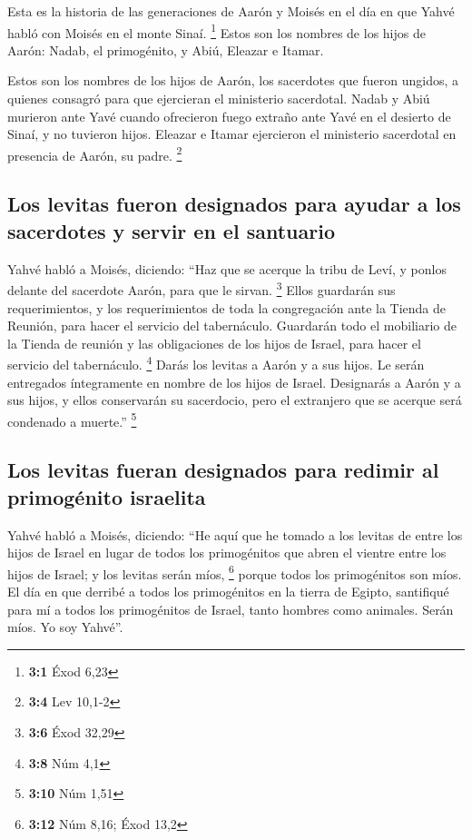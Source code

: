 \begin{paracol}{2}
 Esta es la historia de las generaciones de Aarón y Moisés
en el día en que Yahvé habló con Moisés en el monte Sinaí. \footnote{\textbf{3:1}
  Éxod 6,23}  Estos son los nombres de los hijos de Aarón:
Nadab, el primogénito, y Abiú, Eleazar e Itamar.

 Estos son los nombres de los hijos de Aarón, los
sacerdotes que fueron ungidos, a quienes consagró para que ejercieran el
ministerio sacerdotal.  Nadab y Abiú murieron ante Yavé
cuando ofrecieron fuego extraño ante Yavé en el desierto de Sinaí, y no
tuvieron hijos. Eleazar e Itamar ejercieron el ministerio sacerdotal en
presencia de Aarón, su padre. \footnote{\textbf{3:4} Lev 10,1-2}

\hypertarget{los-levitas-fueron-designados-para-ayudar-a-los-sacerdotes-y-servir-en-el-santuario}{%
\subsection{Los levitas fueron designados para ayudar a los sacerdotes y
servir en el
santuario}\label{los-levitas-fueron-designados-para-ayudar-a-los-sacerdotes-y-servir-en-el-santuario}}

 Yahvé habló a Moisés, diciendo:  ``Haz que
se acerque la tribu de Leví, y ponlos delante del sacerdote Aarón, para
que le sirvan. \footnote{\textbf{3:6} Éxod 32,29}  Ellos
guardarán sus requerimientos, y los requerimientos de toda la
congregación ante la Tienda de Reunión, para hacer el servicio del
tabernáculo.  Guardarán todo el mobiliario de la Tienda de
reunión y las obligaciones de los hijos de Israel, para hacer el
servicio del tabernáculo. \footnote{\textbf{3:8} Núm 4,1} 
Darás los levitas a Aarón y a sus hijos. Le serán entregados
íntegramente en nombre de los hijos de Israel. 
Designarás a Aarón y a sus hijos, y ellos conservarán su sacerdocio,
pero el extranjero que se acerque será condenado a muerte.'' \footnote{\textbf{3:10}
  Núm 1,51}

\hypertarget{los-levitas-fueran-designados-para-redimir-al-primoguxe9nito-israelita}{%
\subsection{Los levitas fueran designados para redimir al primogénito
israelita}\label{los-levitas-fueran-designados-para-redimir-al-primoguxe9nito-israelita}}

 Yahvé habló a Moisés, diciendo:  ``He
aquí que he tomado a los levitas de entre los hijos de Israel en lugar
de todos los primogénitos que abren el vientre entre los hijos de
Israel; y los levitas serán míos, \footnote{\textbf{3:12} Núm 8,16; Éxod
  13,2}  porque todos los primogénitos son míos. El día
en que derribé a todos los primogénitos en la tierra de Egipto,
santifiqué para mí a todos los primogénitos de Israel, tanto hombres
como animales. Serán míos. Yo soy Yahvé''.


\end{paracol}
